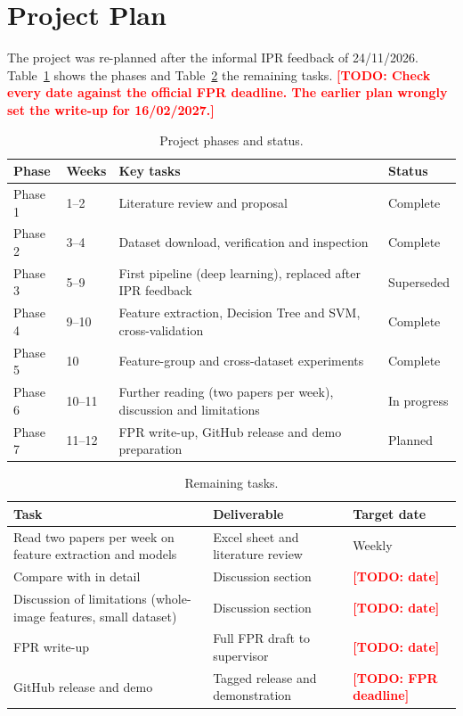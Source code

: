 \documentclass[11pt,a4paper]{article}
\newcommand{\todo}[1]{\textcolor{red}{\textbf{[TODO: #1]}}}
\begin{document}
\section{Project Plan}
The project was re-planned after the informal IPR feedback of 24/11/2026. Table~\ref{tab:phases} shows the phases and Table~\ref{tab:remaining} the remaining tasks. \todo{Check every date against the official FPR deadline. The earlier plan wrongly set the write-up for 16/02/2027.}

\begin{table}[htbp]
  \centering
  \caption{Project phases and status.}
  \label{tab:phases}
  \small
  \begin{tabularx}{\linewidth}{l l X l}
    \toprule
    \textbf{Phase} & \textbf{Weeks} & \textbf{Key tasks} & \textbf{Status} \\
    \midrule
    Phase 1 & 1--2 & Literature review and proposal & Complete \\
    Phase 2 & 3--4 & Dataset download, verification and inspection & Complete \\
    Phase 3 & 5--9 & First pipeline (deep learning), replaced after IPR feedback & Superseded \\
    Phase 4 & 9--10 & Feature extraction, Decision Tree and SVM, cross-validation & Complete \\
    Phase 5 & 10 & Feature-group and cross-dataset experiments & Complete \\
    Phase 6 & 10--11 & Further reading (two papers per week), discussion and limitations & In progress \\
    Phase 7 & 11--12 & FPR write-up, GitHub release and demo preparation & Planned \\
    \bottomrule
  \end{tabularx}
\end{table}

\begin{table}[htbp]
  \centering
  \caption{Remaining tasks.}
  \label{tab:remaining}
  \small
  \begin{tabularx}{\linewidth}{X X l}
    \toprule
    \textbf{Task} & \textbf{Deliverable} & \textbf{Target date} \\
    \midrule
    Read two papers per week on feature extraction and models & Excel sheet and literature review & Weekly \\
    Compare with \citet{jaeger2014tmi} in detail & Discussion section & \todo{date} \\
    Discussion of limitations (whole-image features, small dataset) & Discussion section & \todo{date} \\
    FPR write-up & Full FPR draft to supervisor & \todo{date} \\
    GitHub release and demo & Tagged release and demonstration & \todo{FPR deadline} \\
    \bottomrule
  \end{tabularx}
\end{table}
\end{document}
